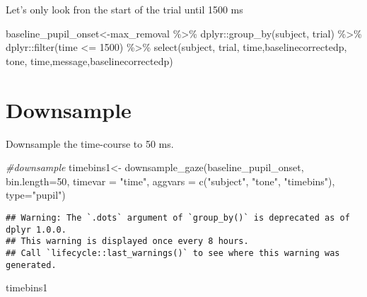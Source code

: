 \documentclass[
]{article}
\newenvironment{Shaded}{\begin{snugshade}}{\end{snugshade}}
\newcommand{\AttributeTok}[1]{\textcolor[rgb]{0.77,0.63,0.00}{#1}}
\newcommand{\CommentTok}[1]{\textcolor[rgb]{0.56,0.35,0.01}{\textit{#1}}}
\newcommand{\DecValTok}[1]{\textcolor[rgb]{0.00,0.00,0.81}{#1}}
\newcommand{\FunctionTok}[1]{\textcolor[rgb]{0.00,0.00,0.00}{#1}}
\newcommand{\NormalTok}[1]{#1}
\newcommand{\OtherTok}[1]{\textcolor[rgb]{0.56,0.35,0.01}{#1}}
\newcommand{\SpecialCharTok}[1]{\textcolor[rgb]{0.00,0.00,0.00}{#1}}
\newcommand{\StringTok}[1]{\textcolor[rgb]{0.31,0.60,0.02}{#1}}
\begin{document}
Let's only look fron the start of the trial until 1500 ms

\begin{Shaded}
\begin{Highlighting}[]
\NormalTok{baseline\_pupil\_onset}\OtherTok{\textless{}{-}}\NormalTok{max\_removal }\SpecialCharTok{\%\textgreater{}\%}
\NormalTok{  dplyr}\SpecialCharTok{::}\FunctionTok{group\_by}\NormalTok{(subject, trial) }\SpecialCharTok{\%\textgreater{}\%}
\NormalTok{  dplyr}\SpecialCharTok{::}\FunctionTok{filter}\NormalTok{(time }\SpecialCharTok{\textless{}=} \DecValTok{1500}\NormalTok{) }\SpecialCharTok{\%\textgreater{}\%}
  \FunctionTok{select}\NormalTok{(subject, trial, time,baselinecorrectedp, tone, time,message,baselinecorrectedp)}
\end{Highlighting}
\end{Shaded}

\hypertarget{downsample}{%
\section{Downsample}\label{downsample}}

Downsample the time-course to 50 ms.

\begin{Shaded}
\begin{Highlighting}[]
\CommentTok{\#downsample}
\NormalTok{timebins1}\OtherTok{\textless{}{-}} \FunctionTok{downsample\_gaze}\NormalTok{(baseline\_pupil\_onset, }\AttributeTok{bin.length=}\DecValTok{50}\NormalTok{, }\AttributeTok{timevar =} \StringTok{"time"}\NormalTok{, }\AttributeTok{aggvars =} \FunctionTok{c}\NormalTok{(}\StringTok{"subject"}\NormalTok{, }\StringTok{"tone"}\NormalTok{, }\StringTok{"timebins"}\NormalTok{), }\AttributeTok{type=}\StringTok{"pupil"}\NormalTok{)}
\end{Highlighting}
\end{Shaded}

\begin{verbatim}
## Warning: The `.dots` argument of `group_by()` is deprecated as of dplyr 1.0.0.
## This warning is displayed once every 8 hours.
## Call `lifecycle::last_warnings()` to see where this warning was generated.
\end{verbatim}

\begin{Shaded}
\begin{Highlighting}[]
\NormalTok{timebins1}
\end{Highlighting}
\end{Shaded}
\end{document}
